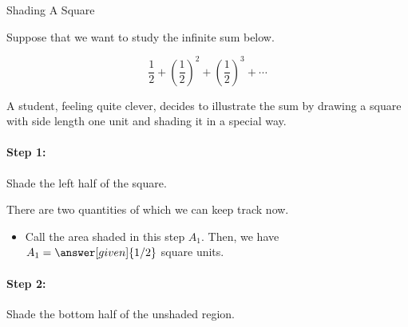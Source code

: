 \documentclass{ximera}
\begin{document}
\begin{example} Shading A Square

Suppose that we want to study the infinite sum below.

\[
\frac{1}{2} + \left(\frac{1}{2}\right)^2+ \left(\frac{1}{2}\right)^3+ \cdots
\]

A student, feeling quite clever, decides to illustrate the sum by drawing a square with side length one unit and shading it in a special way.  


\paragraph{Step 1:} Shade the left half of the square.  

\begin{image}[1in]

\end{image}
There are two quantities of which we can keep track now.
\begin{itemize}
\item Call the area shaded in this step $A_1$.  Then, we have $A_1=\answer[given]{1/2}$ square units.
\end{itemize}

\paragraph{Step 2:} Shade the bottom half of the unshaded region.  

\begin{image}[1in]
\end{image}
\end{example}
\end{document}
